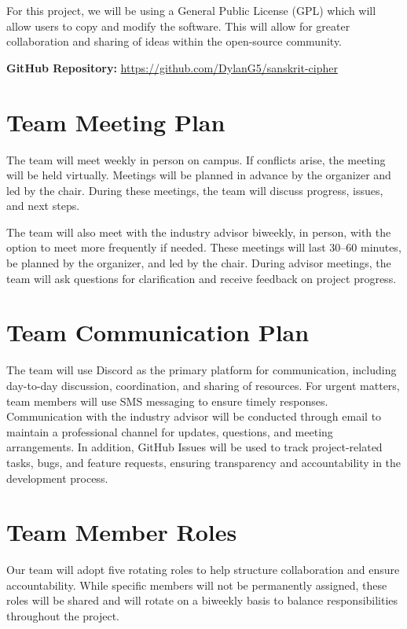 \documentclass{article}
\begin{document}
For this project, we will be using a General Public License (GPL) which will allow users to copy and modify the software. This will allow for greater collaboration and sharing of ideas within the open-source community.

\textbf{GitHub Repository:} \url{https://github.com/DylanG5/sanskrit-cipher}

\section{Team Meeting Plan}

The team will meet weekly in person on campus. If conflicts arise, the meeting will be held virtually. Meetings will be planned in advance by the organizer and led by the chair. During these meetings, the team will discuss progress, issues, and next steps.

The team will also meet with the industry advisor biweekly, in person, with the option to meet more frequently if needed. These meetings will last 30–60 minutes, be planned by the organizer, and led by the chair. During advisor meetings, the team will ask questions for clarification and receive feedback on project progress.

\section{Team Communication Plan}

The team will use Discord as the primary platform for communication, including day-to-day
discussion, coordination, and sharing of resources. For urgent matters, team members will
use SMS messaging to ensure timely responses. Communication with the industry advisor will
be conducted through email to maintain a professional channel for updates, questions, and
meeting arrangements. In addition, GitHub Issues will be used to track project-related tasks,
bugs, and feature requests, ensuring transparency and accountability in the development process.

\section{Team Member Roles}

Our team will adopt five rotating roles to help structure collaboration and ensure accountability.
While specific members will not be permanently assigned, these roles will be shared and will
rotate on a biweekly basis to balance responsibilities throughout the project.
\end{document}
